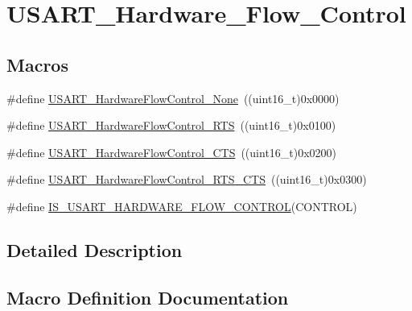 \hypertarget{group___u_s_a_r_t___hardware___flow___control}{}\section{U\+S\+A\+R\+T\+\_\+\+Hardware\+\_\+\+Flow\+\_\+\+Control}
\label{group___u_s_a_r_t___hardware___flow___control}
\subsection*{Macros}
\begin{DoxyCompactItemize}
\item 
\#define \mbox{\hyperlink{group___u_s_a_r_t___hardware___flow___control_gaf3deaf4429b88db7753ee203f4797bd3}{U\+S\+A\+R\+T\+\_\+\+Hardware\+Flow\+Control\+\_\+\+None}}~((uint16\+\_\+t)0x0000)
\item 
\#define \mbox{\hyperlink{group___u_s_a_r_t___hardware___flow___control_ga22d4339693e3356d992abca259b0418e}{U\+S\+A\+R\+T\+\_\+\+Hardware\+Flow\+Control\+\_\+\+R\+TS}}~((uint16\+\_\+t)0x0100)
\item 
\#define \mbox{\hyperlink{group___u_s_a_r_t___hardware___flow___control_ga4d989f112f94009c0849fe4dbe829d81}{U\+S\+A\+R\+T\+\_\+\+Hardware\+Flow\+Control\+\_\+\+C\+TS}}~((uint16\+\_\+t)0x0200)
\item 
\#define \mbox{\hyperlink{group___u_s_a_r_t___hardware___flow___control_ga2986aed8c6cba414ac8afe0180ab553e}{U\+S\+A\+R\+T\+\_\+\+Hardware\+Flow\+Control\+\_\+\+R\+T\+S\+\_\+\+C\+TS}}~((uint16\+\_\+t)0x0300)
\item 
\#define \mbox{\hyperlink{group___u_s_a_r_t___hardware___flow___control_ga9b905eb465780173a2e98bc8b602c030}{I\+S\+\_\+\+U\+S\+A\+R\+T\+\_\+\+H\+A\+R\+D\+W\+A\+R\+E\+\_\+\+F\+L\+O\+W\+\_\+\+C\+O\+N\+T\+R\+OL}}(C\+O\+N\+T\+R\+OL)
\end{DoxyCompactItemize}


\subsection{Detailed Description}


\subsection{Macro Definition Documentation}
\mbox{\label{group___u_s_a_r_t___hardware___flow___control_ga9b905eb465780173a2e98bc8b602c030}} 
